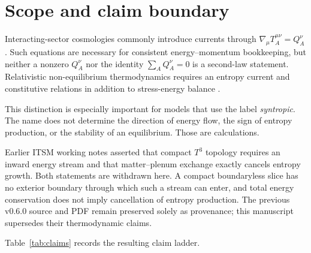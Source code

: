 \documentclass[aps,prd,reprint,superscriptaddress,nofootinbib,floatfix]{revtex4-2}
\newcommand{\Tthree}{T^{3}}
\begin{document}
\maketitle

\section{Scope and claim boundary}
\label{sec:scope}

Interacting-sector cosmologies commonly introduce currents through
\(\nabla_\mu T_A^{\mu\nu}=Q_A^\nu\).  Such equations are necessary for
consistent energy--momentum bookkeeping, but neither a nonzero \(Q_A^\nu\) nor
the identity \(\sum_AQ_A^\nu=0\) is a second-law statement.  Relativistic
non-equilibrium thermodynamics requires an entropy current and constitutive
relations in addition to stress-energy balance
\cite{israel_stewart,calvao_lima_waga,iosifidis2024}.

This distinction is especially important for models that use the label
\emph{syntropic}.  The name does not determine the direction of energy flow,
the sign of entropy production, or the stability of an equilibrium.  Those
are calculations.

Earlier ITSM working notes asserted that compact \(\Tthree\) topology requires
an inward energy stream and that matter--plenum exchange exactly cancels
entropy growth.  Both statements are withdrawn here.  A compact boundaryless
slice has no exterior boundary through which such a stream can enter, and
total energy conservation does not imply cancellation of entropy production.
The previous v0.6.0 source and PDF remain preserved solely as provenance; this
manuscript supersedes their thermodynamic claims.

Table~\ref{tab:claims} records the resulting claim ladder.
\end{document}
